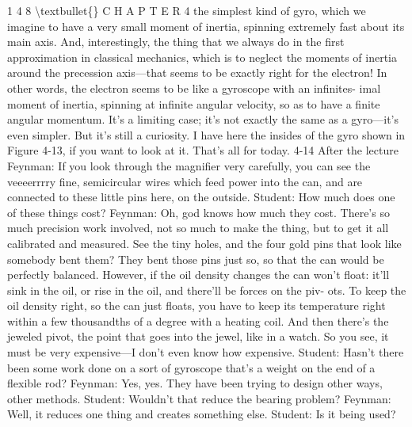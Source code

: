 \documentclass[10pt,oneside]{article}
\begin{document}
1 4 8 \textbackslash{}textbullet\{\} C H A P T E R  4 the simplest kind of gyro, which we imagine to have a very small moment of inertia, spinning extremely fast about its main axis. And, interestingly, the thing that we always do in the first approximation in classical mechanics, which is to neglect the moments of inertia around the precession axis---that seems to be exactly right for the electron! In other words, the electron seems to be like a gyroscope with an infinites- imal moment of inertia, spinning at infinite angular velocity, so as to have a finite angular momentum. It’s a limiting case; it’s not exactly the same as a gyro---it’s even simpler. But it’s still a curiosity. I have here the insides of the gyro shown in Figure 4-13, if you want to look at it. That’s all for today. 4-14 After the lecture Feynman: If you look through the magnifier very carefully, you can see the veeeerrrry fine, semicircular wires which feed power into the can, and are connected to these little pins here, on the outside. Student: How much does one of these things cost? Feynman: Oh, god knows how much they cost. There’s so much precision work involved, not so much to make the thing, but to get it all calibrated and measured. See the tiny holes, and the four gold pins that look like somebody bent them? They bent those pins just so, so that the can would be perfectly balanced. However, if the oil density changes the can won’t float: it’ll sink in the oil, or rise in the oil, and there’ll be forces on the piv- ots. To keep the oil density right, so the can just floats, you have to keep its temperature right within a few thousandths of a degree with a heating coil. And then there’s the jeweled pivot, the point that goes into the jewel, like in a watch. So you see, it must be very expensive---I don’t even know how expensive. Student: Hasn’t there been some work done on a sort of gyroscope that’s a weight on the end of a flexible rod? Feynman: Yes, yes. They have been trying to design other ways, other methods. Student: Wouldn’t that reduce the bearing problem? Feynman: Well, it reduces one thing and creates something else. Student: Is it being used?\par
\end{document}
